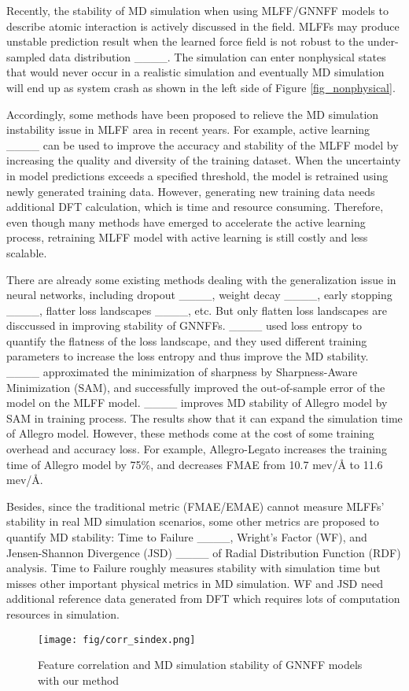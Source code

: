 Recently, the stability of MD simulation when using MLFF/GNNFF models to describe atomic interaction is actively discussed in the field. MLFFs may produce unstable prediction result when the learned force field is not robust to the under-sampled data distribution ____. The simulation can enter nonphysical states that would never occur in a realistic simulation and eventually MD simulation will end up as system crash as shown in the left side of Figure \ref{fig_nonphysical}. 

Accordingly, some methods have been proposed to relieve the MD simulation instability issue in MLFF area in recent years. For example, active learning ____ can be used to improve the accuracy and stability of the MLFF model by increasing the quality and diversity of the training dataset. When the uncertainty in model predictions exceeds a specified threshold, the model is retrained using newly generated training data. However, generating new training data needs additional DFT calculation, which is time and resource consuming. Therefore, even though many methods have emerged to accelerate the active learning process, retraining MLFF model with active learning is still costly and less scalable.

There are already some existing methods dealing with the generalization issue in neural networks, including dropout ____, weight decay ____, early stopping ____, flatter loss landscapes ____, etc. But only flatten loss landscapes are disccussed in improving stability of GNNFFs.
____ used loss entropy to quantify the flatness of the loss landscape, and they used different training parameters to increase the loss entropy and thus improve the MD stability.
____ approximated the minimization of sharpness by Sharpness-Aware Minimization (SAM), and successfully improved the out-of-sample error of the model on the MLFF model.
____ improves MD stability of Allegro model by SAM in training process. The results show that it can expand the simulation time of Allegro model. However, these methods come at the cost of some training overhead and accuracy loss. For example, Allegro-Legato increases the training time of Allegro model by 75\%, and decreases FMAE from 10.7 mev/Å to 11.6 mev/Å.

Besides, since the traditional metric (FMAE/EMAE) cannot measure MLFFs' stability in real MD simulation scenarios, some other metrics are proposed to quantify MD stability: Time to Failure ____, Wright's Factor (WF), and Jensen-Shannon Divergence (JSD) ____ of Radial Distribution Function (RDF) analysis. Time to Failure roughly measures stability with simulation time but misses other important physical metrics in MD simulation. WF and JSD need additional reference data generated from DFT which requires lots of computation resources in simulation.

\begin{figure}[t]
  \centering
  \texttt{[image: fig/corr\_sindex.png]}
  \caption{Feature correlation and MD simulation stability of GNNFF models with our method}
  \label{fig_corr_sindex}
  \vspace*{-1.0\baselineskip}
\end{figure}